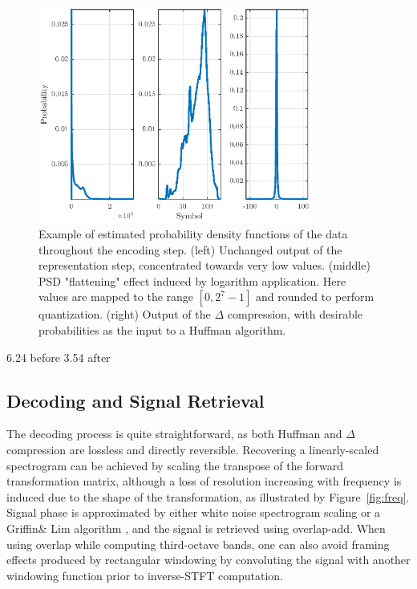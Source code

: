 \documentclass[final,3p,times,twocolumn]{elsarticle}
\begin{document}
\begin{figure}[htbp]
	\centering
		\includegraphics[width=0.8\textwidth]{pdf.eps}
	\caption{Example of estimated probability density functions of the data throughout the encoding step. (left) Unchanged output of the representation step, concentrated towards very low values. (middle) PSD "flattening" effect induced by logarithm application. Here values are mapped to the range $[0, 2^7-1]$ and rounded to perform quantization. (right) Output of the $\Delta$ compression, with desirable probabilities as the input to a Huffman algorithm.}
	\label{fig:pdf}
\end{figure}
6.24 before
3.54 after

\subsection{Decoding and Signal Retrieval}

The decoding process is quite straightforward, as both Huffman and $\Delta$ compression are lossless and directly reversible. Recovering a linearly-scaled spectrogram can be achieved by scaling the transpose of the forward transformation matrix, although a loss of resolution increasing with frequency is induced due to the shape of the transformation, as illustrated by Figure~\ref{fig:freq}. Signal phase is approximated by either white noise spectrogram scaling or a Griffin\& Lim algorithm \cite{griffin1984}, and the signal is retrieved using overlap-add. When using overlap while computing third-octave bands, one can also avoid framing effects produced by rectangular windowing by convoluting the signal with another windowing function prior to inverse-STFT computation.\\
\end{document}
